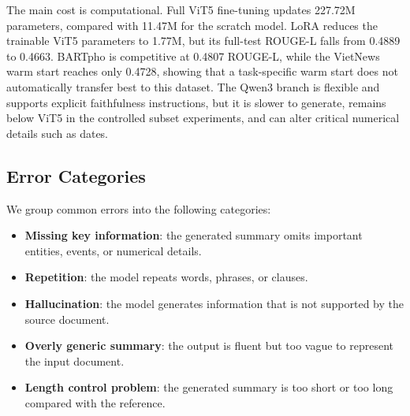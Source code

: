 \documentclass[conference]{IEEEtran}
\begin{document}
The main cost is computational. Full ViT5 fine-tuning updates 227.72M parameters, compared with 11.47M for the scratch model. LoRA reduces the trainable ViT5 parameters to 1.77M, but its full-test ROUGE-L falls from 0.4889 to 0.4663. BARTpho is competitive at 0.4807 ROUGE-L, while the VietNews warm start reaches only 0.4728, showing that a task-specific warm start does not automatically transfer best to this dataset. The Qwen3 branch is flexible and supports explicit faithfulness instructions, but it is slower to generate, remains below ViT5 in the controlled subset experiments, and can alter critical numerical details such as dates.

\subsection{Error Categories}
We group common errors into the following categories:
\begin{itemize}
    \item \textbf{Missing key information}: the generated summary omits important entities, events, or numerical details.
    \item \textbf{Repetition}: the model repeats words, phrases, or clauses.
    \item \textbf{Hallucination}: the model generates information that is not supported by the source document.
    \item \textbf{Overly generic summary}: the output is fluent but too vague to represent the input document.
    \item \textbf{Length control problem}: the generated summary is too short or too long compared with the reference.
\end{itemize}
\end{document}
